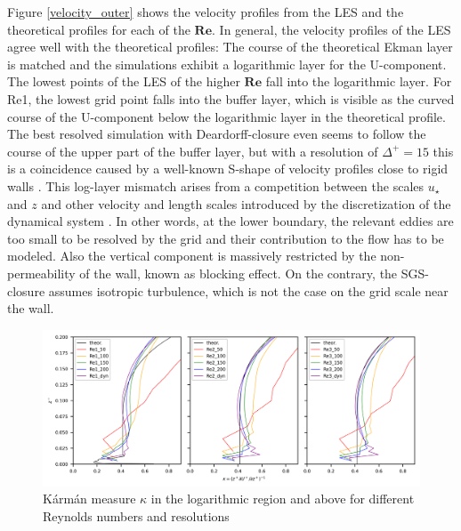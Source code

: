 \documentclass[draft,a4paper,11pt]{article}
\newcommand{\RE}{\mathbf{Re}}
\begin{document}
Figure \ref{velocity_outer} shows the velocity profiles from the LES and the theoretical profiles for each of the $\RE$. In general, the velocity profiles of the LES agree well with the theoretical profiles: The course of the theoretical Ekman layer is matched and the simulations exhibit a logarithmic layer for the U-component. The lowest points of the LES of the higher $\RE$ fall into the logarithmic layer. For Re1, the lowest grid point falls into the buffer layer, which is visible as the curved course of the U-component below the logarithmic layer in the theoretical profile. The best resolved simulation with Deardorff-closure even seems to follow the course of the upper part of the buffer layer, but with a resolution of $\Delta^+=15$ this is a coincidence caused by a well-known S-shape of velocity profiles close to rigid walls \cite{brasseur2010designing}. This log-layer mismatch arises from a competition between the scales $u_\star$ and $z$ and other velocity and length scales introduced by the discretization of the dynamical system \citep{mason1992stochastic,brasseur2010designing}. In other words, at the lower boundary, the relevant eddies are too small to be resolved by the grid and their contribution to the flow has to be modeled. Also the vertical component is massively restricted by the non-permeability of the wall, known as blocking effect. On the contrary, the SGS-closure assumes isotropic turbulence, which is not the case on the grid scale near the wall.

\begin{figure}[ht]
  \centerline{
	\includegraphics[width=\textwidth]{figures_2024/d3y_3Re_kappa}
}
  \caption{K\'arm\'an measure $\kappa$ in the logarithmic region and above for different Reynolds numbers and resolutions}
  \label{3Re_kappa}
\end{figure}
\end{document}

